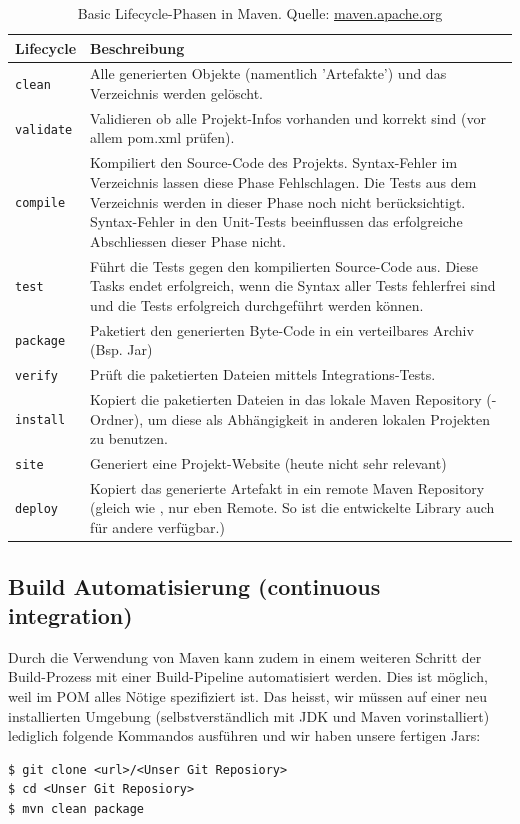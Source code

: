 \begin{table}[H]
	\centering
	\begin{tabular}{lp{13cm}} \toprule
		\textbf{Lifecycle} & \textbf{Beschreibung}\\ \midrule
		\texttt{clean}     & Alle generierten Objekte (namentlich 'Artefakte') und das Verzeichnis \ctexttt{target} werden gelöscht.\\ \midrule
		\texttt{validate}  & Validieren ob alle Projekt-Infos vorhanden und korrekt sind (vor allem pom.xml prüfen).\\ \midrule
		\texttt{compile}   & Kompiliert den Source-Code des Projekts. Syntax-Fehler im Verzeichnis \ctexttt{src/main/..} lassen diese Phase Fehlschlagen. Die Tests aus dem Verzeichnis \ctexttt{src/test/..} werden in dieser Phase noch nicht berücksichtigt. Syntax-Fehler in den Unit-Tests beeinflussen das erfolgreiche Abschliessen dieser Phase nicht.\\ \midrule
		\texttt{test}	   & Führt die Tests gegen den kompilierten Source-Code aus. Diese Tasks endet erfolgreich, wenn die Syntax aller Tests fehlerfrei sind und die Tests erfolgreich durchgeführt werden können.\\ \midrule
		\texttt{package}   & Paketiert den generierten Byte-Code in ein verteilbares Archiv (Bsp. Jar)\\ \midrule
		\texttt{verify}	   & Prüft die paketierten Dateien mittels Integrations-Tests.\\ \midrule
		\texttt{install}   & Kopiert die paketierten Dateien in das lokale Maven Repository (\ctexttt{.m2}-Ordner), um diese als Abhängigkeit in anderen lokalen Projekten zu benutzen.\\ \midrule
		\texttt{site}      & Generiert eine Projekt-Website (heute nicht sehr relevant) \\ \midrule
		\texttt{deploy}	   & Kopiert das generierte Artefakt in ein remote Maven Repository (gleich wie \ctexttt{install}, nur eben Remote. So ist die entwickelte Library auch für andere verfügbar.)				\\ \bottomrule
	\end{tabular}
	\caption{Basic Lifecycle-Phasen in Maven. Quelle: \href{https://maven.apache.org}{maven.apache.org} \cite{maven-build-lifecycle} }
	\label{tab:mavenLifecycle}
\end{table}

\subsection{Build Automatisierung (continuous integration)}
Durch die Verwendung von Maven kann zudem in einem weiteren Schritt der Build-Prozess mit einer Build-Pipeline automatisiert werden. Dies ist möglich, weil im POM alles Nötige spezifiziert ist. Das heisst, wir müssen auf einer neu installierten Umgebung (selbstverständlich mit JDK und Maven vorinstalliert) lediglich folgende Kommandos ausführen und wir haben unsere fertigen Jars:
\begin{lstlisting}[language={none}]
$ git clone <url>/<Unser Git Reposiory>
$ cd <Unser Git Reposiory>
$ mvn clean package
\end{lstlisting}

